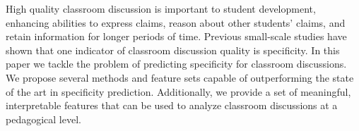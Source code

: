 High quality classroom discussion is important to student development, enhancing abilities to express claims, reason about other students' claims, and retain information for longer periods of time. Previous small-scale studies have shown that one indicator of classroom discussion quality is specificity. In this paper we tackle the problem of predicting specificity for classroom discussions. We propose several methods and feature sets capable of outperforming the state of the art in specificity prediction. Additionally, we provide a set of meaningful, interpretable features that can be used to analyze classroom discussions at a pedagogical level.
